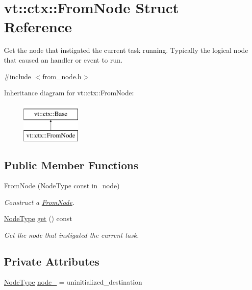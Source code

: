 \hypertarget{structvt_1_1ctx_1_1_from_node}{}\section{vt\+:\+:ctx\+:\+:From\+Node Struct Reference}
\label{structvt_1_1ctx_1_1_from_node}


Get the node that instigated the current task running. Typically the logical node that caused an handler or event to run.  




{\ttfamily \#include $<$from\+\_\+node.\+h$>$}

Inheritance diagram for vt\+:\+:ctx\+:\+:From\+Node\+:\begin{figure}[H]
\begin{center}
\leavevmode
\includegraphics[height=2.000000cm]{structvt_1_1ctx_1_1_from_node}
\end{center}
\end{figure}
\subsection*{Public Member Functions}
\begin{DoxyCompactItemize}
\item 
\hyperlink{structvt_1_1ctx_1_1_from_node_a67580fa04255325197b1b03c96f505a8}{From\+Node} (\hyperlink{namespacevt_a866da9d0efc19c0a1ce79e9e492f47e2}{Node\+Type} const in\+\_\+node)
\begin{DoxyCompactList}\small\item\em Construct a {\ttfamily \hyperlink{structvt_1_1ctx_1_1_from_node}{From\+Node}}. \end{DoxyCompactList}\item 
\hyperlink{namespacevt_a866da9d0efc19c0a1ce79e9e492f47e2}{Node\+Type} \hyperlink{structvt_1_1ctx_1_1_from_node_a71ad37247833401a025fd3efa05e5d32}{get} () const
\begin{DoxyCompactList}\small\item\em Get the node that instigated the current task. \end{DoxyCompactList}\end{DoxyCompactItemize}
\subsection*{Private Attributes}
\begin{DoxyCompactItemize}
\item 
\hyperlink{namespacevt_a866da9d0efc19c0a1ce79e9e492f47e2}{Node\+Type} \hyperlink{structvt_1_1ctx_1_1_from_node_a9a94ab38bc3cd472de9d564adbd91eca}{node\+\_\+} = uninitialized\+\_\+destination
\end{DoxyCompactItemize}


